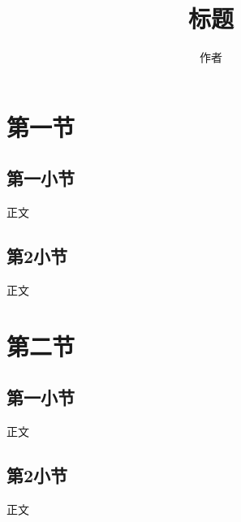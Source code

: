 \documentclass[UTF8, 12pt]{ctexart}
\title{标题}
\author{作者}
\begin{document}
\maketitle
\clearpage
\tableofcontents
\clearpage

\section{第一节}
\subsection{第一小节}
正文
\subsection{第2小节}
正文
\section{第二节}
\subsection{第一小节}
正文
\subsection{第2小节}
正文
\end{document}
